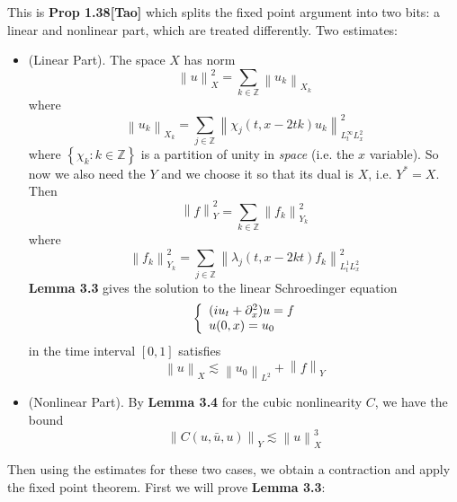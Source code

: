 \documentclass{article}
\newcommand\norm[1]{\left\lVert#1\right\rVert}
\begin{document}
This is \textbf{Prop 1.38[Tao]} which splits the fixed point argument into two bits: a
linear and nonlinear part, which are treated differently. Two estimates:
\begin{itemize}
  \item (Linear Part). The space $X$ has norm
  \begin{equation*}
    \norm{u}_{X}^{2} = \sum_{k\in \mathbb{Z}}  \norm{u_{k}}_{X_{k}}
  \end{equation*}
  where
  \begin{equation*}
    \norm{u_{k}}_{X_{k}}= \sum_{j\in \mathbb{Z}}
    \norm{\chi_{j}(t,x-2tk)u_{k}}_{L_{t}^{\infty}L_{x}^{2}}^{2}
  \end{equation*}
  where $\left\{\chi_{k}: k\in \mathbb{Z}\right\}$ is a partition of unity in
  \textit{space} (i.e. the $x$ variable). So now we also need the $Y$ and we
  choose it so that its dual is $X$, i.e. $Y^{*} = X$. Then
  \begin{equation*}
    \norm{f}_{Y}^{2} = \sum_{k\in \mathbb{Z}}\norm{f_{k}}_{Y_{k}}^{2} 
  \end{equation*}
  where
  \begin{equation*}
    \norm{f_{k}}_{Y_{k}}^{2} = \sum_{j\in \mathbb{Z}}\norm{\lambda_{j}(t,x-2kt)f_{k}}_{L_{t}^{1}L_{x}^{2}}^{2}
  \end{equation*}
  \textbf{Lemma 3.3} gives the solution to the linear Schroedinger equation
  \begin{equation*}
    \left\{ \begin{array}{l@{}l}
        (iu_{t}+\partial_{x}^{2})u= f\\
        u(0,x)=u_{0}
      \end{array}\right.
  \end{equation*}
  in the time interval $[0,1]$ satisfies
  \begin{equation}\label{eq:19}
    \norm{u}_{X} \lesssim \norm{u_{0}}_{L^{2}}+ \norm{f}_{Y}
  \end{equation}
  \item (Nonlinear Part). By \textbf{Lemma 3.4} for the cubic nonlinearity $C$,
  we have the bound 
  \begin{equation}\label{eq:20}
    \norm{C(u,\bar{u},u)}_{Y}\lesssim \norm{u}_{X}^{3}
  \end{equation}
      
\end{itemize}
Then using the estimates for these two cases, we obtain a contraction and apply
the fixed point theorem. First we will prove \textbf{Lemma 3.3}:
\end{document}
